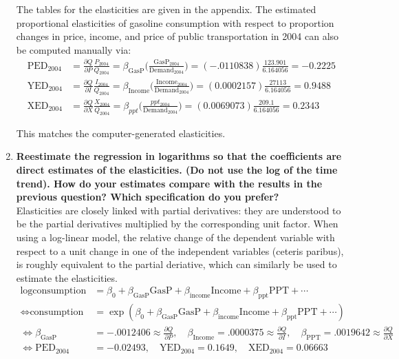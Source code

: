 \documentclass{article}
\begin{document}
\begin{enumerate}[label=\alph*.]
The tables for the elasticities are given in the appendix. The estimated proportional elasticities of gasoline consumption  with respect to proportion changes in price, income, and price of public transportation in 2004 can also be computed manually via:
\begin{align*}
\text{PED}_{2004} &= \frac{\partial Q}{\partial P}\frac{P_{2004}}{Q_{2004}} = \beta_{\text{GasP}} \Big( \frac{\text{GasP}_{2004}}{\text{Demand}_{2004}} \Big) = (-.0110838)\frac{123.901}{6.164056} = -0.2225 \\
\text{YED}_{2004} &= \frac{\partial Q}{ \partial I}\frac{I_{2004}}{Q_{2004}} = \beta_{\text{Income}} \Big( \frac{\text{Income}_{2004}} {\text{Demand}_{2004}} \Big)= (0.0002157)\frac{27113}{6.164056} = 0.9488 \\
\text{XED}_{2004} &= \frac{\partial Q}{ \partial X} \frac{X_{2004}}{Q_{2004}} = \beta_{ppt} \Big( \frac{ppt_{2004}}{\text{Demand}_{2004}} \Big) = (	0.0069073) \frac{209.1}{6.164056} = 0.2343
\end{align*}

This matches the computer-generated elasticities.


\newpage
\item \textbf{Reestimate the regression in logarithms so that the coefficients are direct estimates of the elasticities. (Do not use the log of the time trend). How do your estimates compare with the results in the previous question? Which specification do you prefer?}\\

Elasticities are closely linked with partial derivatives: they are understood to be the partial derivatives multiplied by the corresponding unit factor. When using a log-linear model, the relative change of the dependent variable with respect to a unit change in one of the independent variables (ceteris paribus), is roughly equivalent to the partial deriative, which can similarly be used to estimate the elasticities.
\begin{align*}
\log{\text{consumption}}	& = \beta_0 +\beta_{\text{GasP}} \text{GasP} + \beta_{\text{income}}\text{Income} + \beta_{\text{ppt}} \text{PPT} +\cdots \\
\iff \text{consumption} &= \exp (\beta_0 +\beta_{\text{GasP}} \text{GasP} + \beta_{\text{income}}\text{Income} + \beta_{\text{ppt}} \text{PPT} +\cdots) \\
\iff  \beta_{\text{GasP}} & = -.0012406 \approx \frac{\partial Q}{\partial P},  \quad \beta_{\text{Income}}  = .0000375 \approx  \frac{\partial Q}{\partial I},\quad \beta_{\text{PPT}} = .0019642 \approx \frac{\partial Q}{\partial X}\\
\iff \text{PED}_{\text{2004}} &= -0.02493, \quad \text{YED}_{\text{2004}} = 0.1649, \quad \text{XED}_{\text{2004}} = 0.06663
\end{align*}


\end{enumerate}
\end{document}
